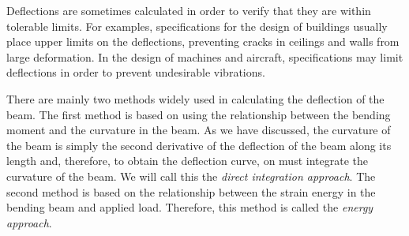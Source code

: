 \documentclass[a4paper,openany,12pt]{book}
\begin{document}
Deflections are sometimes calculated in order to verify that they are
within tolerable limits. For examples, specifications for the design of
buildings usually place upper limits on the deflections, preventing
cracks in ceilings and walls from large deformation. In the design of
machines and aircraft, specifications may limit deflections in order to
prevent undesirable vibrations.

There are mainly two methods widely used in calculating the deflection
of the beam. The first method is based on using the relationship between
the bending moment and the curvature in the beam. As we have discussed,
the curvature of the beam is simply the second derivative of the
deflection of the beam along its length and, therefore, to obtain the
deflection curve, on must integrate the curvature of the beam. We will
call this the \emph{direct integration approach}. The second method is based
on the relationship between the strain energy in the bending beam and
applied load. Therefore, this method is called the \emph{energy approach}.
\end{document}
